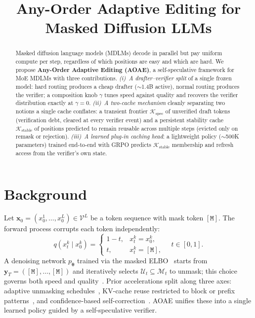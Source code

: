\documentclass[11pt]{article}
\title{Any-Order Adaptive Editing for Masked Diffusion LLMs}
\author{}
\date{}
\newcommand{\cM}{\mathcal{M}}
\newcommand{\cK}{\mathcal{K}}
\newcommand{\cU}{\mathcal{U}}
\newcommand{\cV}{\mathcal{V}}
\newcommand{\btheta}{\bm{\theta}}
\newcommand{\bx}{\mathbf{x}}
\newcommand{\by}{\mathbf{y}}
\newcommand{\mask}{\ensuremath{\mathtt{[M]}}}
\begin{document}
\maketitle

\begin{abstract}
Masked diffusion language models (MDLMs) decode in parallel but pay uniform compute per step, regardless of which positions are easy and which are hard.
We propose \textbf{Any-Order Adaptive Editing (AOAE)}, a self-speculative framework for MoE MDLMs with three contributions.
\emph{(i)~A drafter--verifier split} of a single frozen model: hard routing produces a cheap drafter (${\sim}$1.4B active), normal routing produces the verifier; a composition knob $\gamma$ tunes speed against quality and recovers the verifier distribution exactly at $\gamma{=}0$.
\emph{(ii)~A two-cache mechanism} cleanly separating two notions a single cache conflates: a transient frontier $\cK_{\text{spec}}$ of unverified draft tokens (verification debt, cleared at every verifier event) and a persistent stability cache $\cK_{\text{stable}}$ of positions predicted to remain reusable across multiple steps (evicted only on remask or rejection).
\emph{(iii)~A learned plug-in caching head}: a lightweight policy (${\sim}$500K parameters) trained end-to-end with GRPO predicts $\cK_{\text{stable}}$ membership and refresh access from the verifier's own state.
\end{abstract}

\section{Background}
\label{sec:background}

Let $\bx_0 = (x_0^1, \dots, x_0^L) \in \cV^L$ be a token sequence with mask token $\mask$.
The forward process corrupts each token independently:
\begin{equation}
    q(x_t^k \mid x_0^k) = \begin{cases} 1{-}t, & x_t^k = x_0^k, \\ t, & x_t^k = \mask, \end{cases}
    \quad t \in [0,1].
    \label{eq:forward}
\end{equation}
A denoising network $p_{\btheta}$ trained via the masked ELBO~\cite{ou2024your,sahoo2024simple} starts from $\by_T = (\mask,\ldots,\mask)$ and iteratively selects $\cU_t \subseteq \cM_t$ to unmask; this choice governs both speed and quality~\cite{jazbec2025learning,wu2025fastdllm}.
Prior accelerations split along three axes: adaptive unmasking schedules~\cite{jazbec2025learning,kim2025trainworst}, KV-cache reuse restricted to block or prefix patterns~\cite{ma2025dkv,elastic_cache}, and confidence-based self-correction~\cite{kim2025prism}.
AOAE unifies these into a single learned policy guided by a self-speculative verifier.
\end{document}

